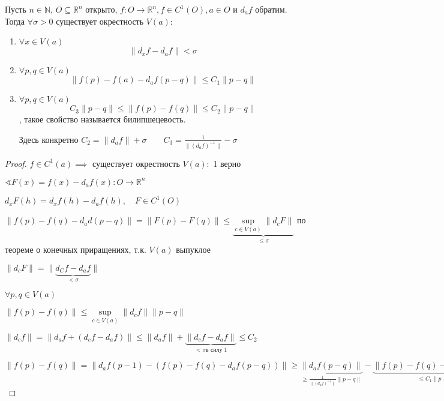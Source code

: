 \documentclass{book}
\newcommand\N{\ensuremath{\mathbb{N}}}
\newcommand\R{\ensuremath{\mathbb{R}}}
\theoremstyle{definition}
\begin{document}
        \begin{lemma}
            Пусть $n\in \N $, $O\subseteq \R^n$ открыто, $f:O\to \R^n, f\in C^1(O), a\in O$ и $d_af$ обратим. Тогда  $\forall \sigma >0 $ существует окрестность $V(a):$
             \begin{enumerate}
                 \item $\forall x\in V(a)$ \[\|d_xf - d_af\| < \sigma\]
                 \item $\forall p, q\in V(a)$ \[\|f(p) - f(a) - d_af(p-q)\|\leqslant C_1\|p-q\|\]
                 \item $\forall p, q\in V(a)$ \[C_3 \|p-q\| \leqslant  \|f(p) - f(q)\| \leqslant C_2 \|p-q\|\], такое свойство называется билипшецевость.

                     Здесь конкретно $C_2 = \|d_af\| + \sigma\qquad C_3 = \frac{1}{\|\left( d_af \right) ^{-1}\|} - \sigma$
            \end{enumerate}
        \end{lemma}
        \begin{proof}
            $f\in C^1(a) \implies$ существует окрестность $V(a):$ 1 верно

            $\sphericalangle F(x) = f(x) - d_af(x): O \to \R^n$

            $d_xF(h) = d_xf(h) - d_af(h), \quad F\in C^1(O)$

            $\|f(p) - f(q) - d_ad(p-q)\| = \|F(p) - F(q)\|\leqslant\underbrace{ \sup\limits_{c\in V(a)} \|d_cF\|}_{\leqslant \sigma}$ по теореме о конечных приращениях, т.к. $V(a)$ выпуклое

            $\|d_cF\| = \|\underbrace{d_Cf - d_af}_{<\sigma}\|$

            $\forall p, q\in V(a)$

            $\|f(p) - f(q)\| \leqslant  \sup\limits_{c\in V(a)} \|d_cf\| \|p-q\|$ 

            $\|d_c f\| = \|d_af + \left( d_cf - d_af \right) \| \leqslant  \|d_af\| + \underbrace{\|d_cf - d_af\|}_{<\sigma \text{в силу 1}} \leqslant  C_2$ 

            $\|f(p) - f(q)\| = \|d_af(p-1) - \left( f(p) - f(q)   - d_af(p-q) \right)\| \geqslant  \underbrace{\|d_af(p-q)\|}_{\geqslant  \frac{1}{\|\left( d_af \right) ^{-1}\|} \|p-q\|} - \underbrace{\|f(p) - f(q) - d_af(p-q)\|}_{\leqslant C_1\|p-q\|} \geqslant  C_3 \|p-q\|$
        \end{proof}
\end{document}
